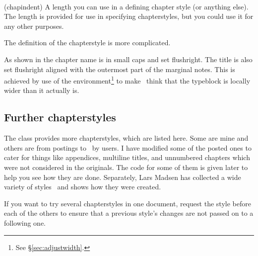 \begin{syntax}
\lnc{\chapindent} \\
\end{syntax}
\glossary(chapindent)%
  {}%
  {A length you can use in a defining chapter style (or anything else).}
The length \lnc{\chapindent} is provided for use in specifying chapterstyles,
but you could use it for any other purposes.

    The definition of the  chapterstyle is more complicated.
\begin{lcode}
\end{lcode}
As shown in  the chapter name is in small caps and set
flushright. The title is also set flushright aligned with the outermost 
part of the marginal notes. This is achieved by use of the 
environment\footnote{See \S\ref{sec:adjustwidth}.} to make \ltx\ think
that the typeblock is locally wider than it actually is.

\subsection{Further chapterstyles}


    The class provides more chapterstyles, which are listed here. 
Some are mine and others are from postings to \ctt\ by 
users. I have modified some of the posted ones to cater for things like 
appendices, multiline titles, and unnumbered chapters which were not 
considered in the originals. The code
for some of them is given later to help you see how they are done.
Separately, Lars Madsen has collected a wide variety of 
styles~\cite{CHAPSTYLES} and shows how they were created.

    If you want to try several chapterstyles in one document, request the
 style before each of the others to ensure that a previous 
style's changes are not passed on to a following one.

